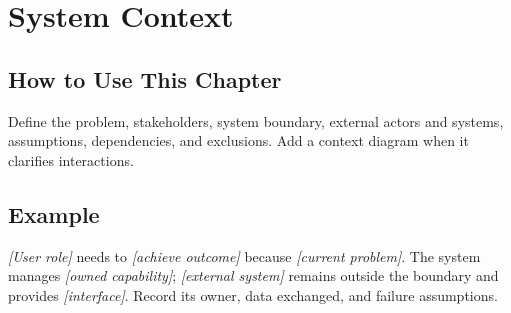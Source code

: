 \chapter{System Context}
\section{How to Use This Chapter}
Define the problem, stakeholders, system boundary, external actors and systems, assumptions, dependencies, and exclusions. Add a context diagram when it clarifies interactions.
\section{Example}
\textit{[User role]} needs to \textit{[achieve outcome]} because \textit{[current problem]}. The system manages \textit{[owned capability]}; \textit{[external system]} remains outside the boundary and provides \textit{[interface]}. Record its owner, data exchanged, and failure assumptions.
